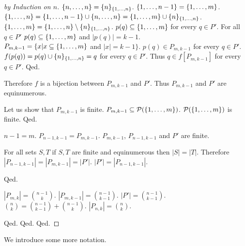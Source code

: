 \documentclass{article}
\begin{document}
\begin{forthel}
\begin{proof}[by Induction on $n$]
   $\{n,\dots,n\} = \{n\}_{\{1,\dots,n\}}$.
   $\{1,\dots,n-1\} = \{1,\dots,m\}$.\\
   $\{1,\dots,n\} = \{1,\dots,n-1\} \cup \{n,\dots,n\} = \{1,\dots,m\} \cup  \{n\}_{\{1,\dots,n\}}$.\\
   $\{1,\dots,m\} = \{1,\dots,n\} \setminus \{n\}_{\{1,\dots,n\}}$.
   $p(q) \subseteq \{1,\dots,m\}$ for every $q \in P'$.
   For all $q \in P'$ $p(q) \subseteq \{1,\dots,m\}$ and $|p(q)| = k-1$.\\
   $P_{m,k-1} = \{x | x \subseteq  \{1,\dots,m\}$ and $|x| = k-1 \}$.
   $p(q) \in P_{m,k-1}$ for every $q \in P'$.
   $f(p(q)) = p(q) \cup  \{n\}_{\{1,\dots,n\}} = q$ for every $q \in P'$.
   Thus $q \in f[P_{m,k-1}]$ for every $q \in P'$.
   Qed.
   
Therefore $f$ is a bijection between $P_{m,k-1}$ and $P'$.
Thus $P_{m,k-1}$ and $P'$ are equinumerous.

Let us show that $P_{m,k-1}$ is finite.
  $P_{m,k-1} \subseteq {\cal P}(\{1,\dots,m\})$.
  ${\cal P}(\{1,\dots,m\})$ is finite.
  Qed.
  
$n-1 = m$.
$P_{n-1,k-1} = P_{m,k-1}$.
$P_{m,k-1}$, $P_{n-1,k-1}$ and $P'$ are finite.

For all sets $S,T$ if $S,T$ are finite and equinumerous then $|S|= |T|$.
Therefore $|P_{n-1,k-1}| = |P_{m,k-1}| = |P'|$.
$|P'| = |P_{n-1,k-1}|$.

Qed.

$|P_{m,k}|=\binom{n-1}{k}$.
$|P_{m,k-1}|=\binom{n-1}{k-1}$.
$|P'|=\binom{n-1}{k-1}$.
$\binom{n}{k}=\binom{n-1}{k-1} + \binom{n-1}{k}$.
$|P_{n,k}|=\binom{n}{k}$.

Qed.
Qed.
Qed.
\end{proof}
\end{forthel}
%
We introduce some more notation.
%
\end{document}
